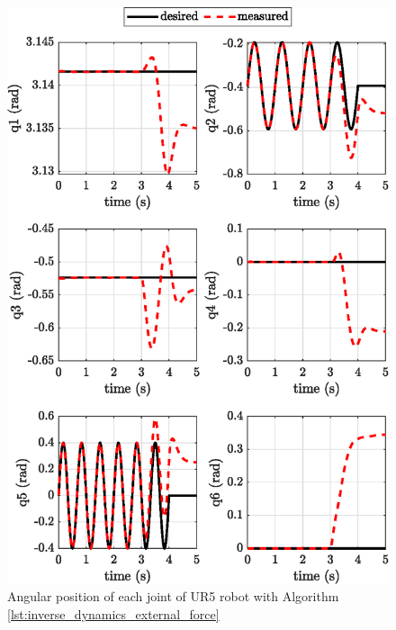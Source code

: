 \begin{figure}[H]
    \centering
    \includegraphics{images/act_2.4_kp_60/joint_position.eps}
    \caption{Angular position of each joint of UR5 robot with Algorithm \ref{lst:inverse_dynamics_external_force}}
    \label{fig:act_2.4_kp_60_joint_position}
\end{figure}
	
